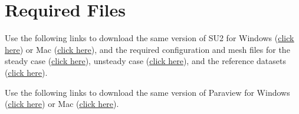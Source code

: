 \section{Required Files}
\begin{su2note}
	Use the following links to download the same version of SU2 for Windows (\href{https://users.encs.concordia.ca/~bvermeir/book/executables/windows/SU2_Windows.zip}{\underline{click here}}) or Mac (\href{https://users.encs.concordia.ca/~bvermeir/book/executables/osx/SU2_Mac.zip}{\underline{click here}}), and the required configuration and mesh files for the steady case (\href{https://gitlab.com/bvermeir/book-cfd/blob/master/tutorial/tut4_laminar_cylinder/cylinder_steady.zip}{\underline{click here}}), unsteady case (\href{https://gitlab.com/bvermeir/book-cfd/blob/master/tutorial/tut4_laminar_cylinder/cylinder_unsteady.zip}{\underline{click here}}), and the reference datasets (\href{https://gitlab.com/bvermeir/book-cfd/blob/master/tutorial/tut4_laminar_cylinder/experimental_values.zip}{\underline{click here}}).
\end{su2note}
\begin{paraviewnote}
	Use the following links to download the same version of Paraview for Windows (\href{https://users.encs.concordia.ca/~bvermeir/book/executables/windows/ParaView-5.4.0-Qt5-OpenGL2-Windows-64bit.exe}{\underline{click here}}) or Mac (\href{https://users.encs.concordia.ca/~bvermeir/book/executables/osx/ParaView-5.4.0-Qt5-OpenGL2-MPI-OSX10.8-64bit.dmg}{\underline{click here}}).
\end{paraviewnote}

